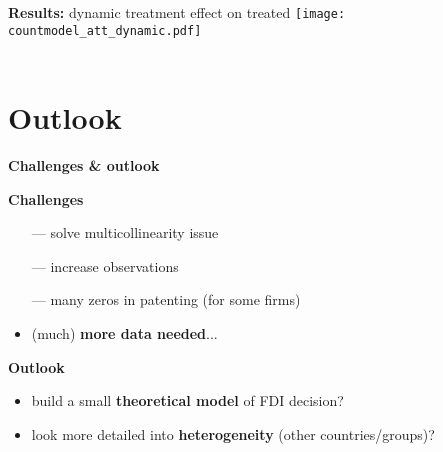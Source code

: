 \documentclass{beamer} %
\begin{document}
\begin{frame}{\textbf{Results:} dynamic treatment effect on treated}
	\centering\texttt{[image: countmodel\_att\_dynamic.pdf]}\\
	\hfill \hyperlink{domestic}{} \\
	\hfill \hyperlink{dynamic}{}
\end{frame}


\section{Outlook}
{
	\begin{frame}[plain]		
		\vspace{1cm}
		{\color{white}\LARGE \textbf{Challenges \& outlook}}
	\end{frame}
}


\begin{frame}{\textbf{Challenges}}
	\begin{itemize}
		\item[---] solve multicollinearity issue
		\vspace{.4cm}
		\item[---] increase observations
		\vspace{.4cm}
		\item[---] many zeros in patenting (for some firms)
		\vspace{.4cm}
		\item (much) \textbf{more data needed}...
	\end{itemize}
\end{frame}

\begin{frame}{\textbf{Outlook}}
	\begin{itemize}
		\item build a small \textbf{theoretical model} of FDI decision?
		\vspace{.4cm}
		\item look more detailed into \textbf{heterogeneity} (other countries/groups)?
	\end{itemize}
\end{frame}
\end{document}

